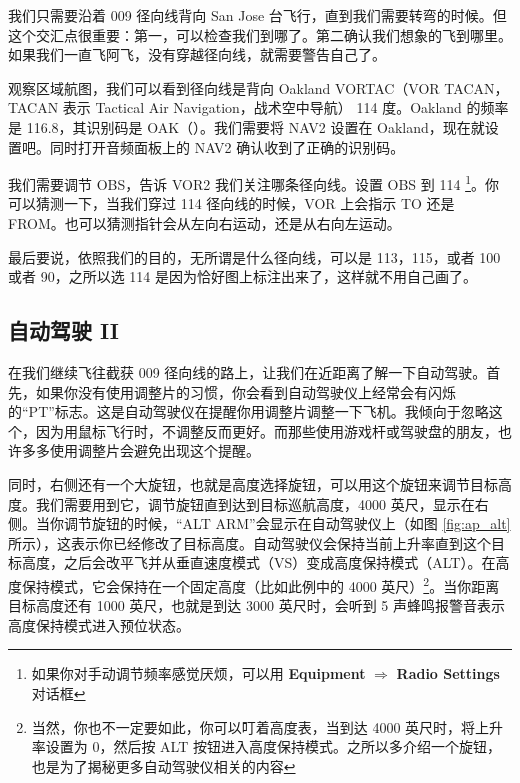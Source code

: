 我们只需要沿着 009 径向线背向 San Jose 台飞行，直到我们需要转弯的时候。但这个交汇点很重要：第一，可以检查我们到哪了。第二确认我们想象的飞到哪里。如果我们一直飞阿飞，没有穿越径向线，就需要警告自己了。

观察区域航图，我们可以看到径向线是背向 Oakland VORTAC（VOR TACAN，TACAN 表示 Tactical Air Navigation，战术空中导航） 114 度。Oakland 的频率是 116.8，其识别码是 OAK（\mdash\mdash\mdash\mspace \mdot\mdash\mspace \mdash\mdot\mdash）。我们需要将 NAV2 设置在 Oakland，现在就设置吧。同时打开音频面板上的 NAV2 确认收到了正确的识别码。

我们需要调节 OBS，告诉 VOR2 我们关注哪条径向线。设置 OBS 到 114 \footnote{如果你对手动调节频率感觉厌烦，可以用 \textbf{\textsf{Equipment}} $\Rightarrow$ \textbf{\textsf{Radio Settings}} 对话框}。你可以猜测一下，当我们穿过 114 径向线的时候，VOR 上会指示 TO 还是 FROM。也可以猜测指针会从左向右运动，还是从右向左运动。

最后要说，依照我们的目的，无所谓是什么径向线，可以是 113，115，或者 100 或者 90，之所以选 114 是因为恰好图上标注出来了，这样就不用自己画了。

\subsection{自动驾驶 II}

在我们继续飞往截获 009 径向线的路上，让我们在近距离了解一下自动驾驶。首先，如果你没有使用调整片的习惯，你会看到自动驾驶仪上经常会有闪烁的“PT”标志。这是自动驾驶仪在提醒你用调整片调整一下飞机。我倾向于忽略这个，因为用鼠标飞行时，不调整反而更好。而那些使用游戏杆或驾驶盘的朋友，也许多多使用调整片会避免出现这个提醒。

同时，右侧还有一个大旋钮，也就是高度选择旋钮，可以用这个旋钮来调节目标高度。我们需要用到它，调节旋钮直到达到目标巡航高度，4000 英尺，显示在右侧。当你调节旋钮的时候，“ALT ARM”会显示在自动驾驶仪上（如图 \ref{fig:ap_alt} 所示），这表示你已经修改了目标高度。自动驾驶仪会保持当前上升率直到这个目标高度，之后会改平飞并从垂直速度模式（VS）变成高度保持模式（ALT）。在高度保持模式，它会保持在一个固定高度（比如此例中的 4000 英尺）\footnote{当然，你也不一定要如此，你可以叮着高度表，当到达 4000 英尺时，将上升率设置为 0，然后按 ALT 按钮进入高度保持模式。之所以多介绍一个旋钮，也是为了揭秘更多自动驾驶仪相关的内容}。当你距离目标高度还有 1000 英尺，也就是到达 3000 英尺时，会听到 5 声蜂鸣报警音表示高度保持模式进入预位状态。

